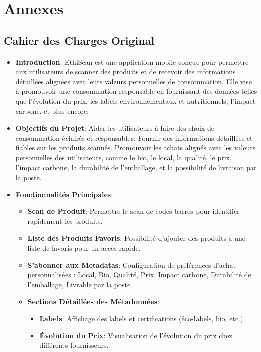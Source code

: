 \section{Annexes}

\subsection{Cahier des Charges Original}

\begin{itemize}
    \item \textbf{Introduction}: EthiScan est une application mobile conçue pour permettre aux utilisateurs de scanner des produits et de recevoir des informations détaillées alignées avec leurs valeurs personnelles de consommation. Elle vise à promouvoir une consommation responsable en fournissant des données telles que l'évolution du prix, les labels environnementaux et nutritionnels, l'impact carbone, et plus encore.
    \item \textbf{Objectifs du Projet}: Aider les utilisateurs à faire des choix de consommation éclairés et responsables. Fournir des informations détaillées et fiables sur les produits scannés. Promouvoir les achats alignés avec les valeurs personnelles des utilisateurs, comme le bio, le local, la qualité, le prix, l'impact carbone, la durabilité de l'emballage, et la possibilité de livraison par la poste.
    \item \textbf{Fonctionnalités Principales}:
          \begin{itemize}
              \item \textbf{Scan de Produit}: Permettre le scan de codes-barres pour identifier rapidement les produits.
              \item \textbf{Liste des Produits Favoris}: Possibilité d'ajouter des produits à une liste de favoris pour un accès rapide.
              \item \textbf{S'abonner aux Metadatas}: Configuration de préférences d'achat personnalisées : Local, Bio, Qualité, Prix, Impact carbone, Durabilité de l'emballage, Livrable par la poste.
              \item \textbf{Sections Détaillées des Métadonnées}:
                    \begin{itemize}
                        \item \textbf{Labels}: Affichage des labels et certifications (éco-labels, bio, etc.).
                        \item \textbf{Évolution du Prix}: Visualisation de l'évolution du prix chez différents fournisseurs.

\end{itemize}
\end{itemize}
\end{itemize}
